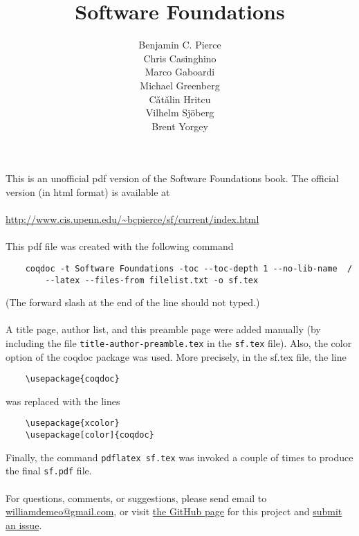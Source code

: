  This is an unofficial pdf version of the Software Foundations book.
The official version (in html format) is available at\\
\\
\url{http://www.cis.upenn.edu/~bcpierce/sf/current/index.html}\\
\\
This pdf file was created with the following command

{\small
\begin{verbatim}
    coqdoc -t Software Foundations -toc --toc-depth 1 --no-lib-name  /
        --latex --files-from filelist.txt -o sf.tex 
\end{verbatim}
}
\noindent (The forward slash at the end of the line should not typed.)\\
\\
A title page, author list, and this preamble page were added manually 
(by including the file {\small {\tt title-author-preamble.tex}} in the {\small
  {\tt sf.tex}} file).  Also, the color option of the coqdoc package was used.  
More precisely, in the sf.tex file, the line
{\small 
\begin{verbatim}
    \usepackage{coqdoc}
\end{verbatim}
}
was replaced with the lines

{\small 
\begin{verbatim}
    \usepackage{xcolor}
    \usepackage[color]{coqdoc}
\end{verbatim}
}
\noindent Finally, the command {\tt pdflatex sf.tex} was invoked a couple of times to
produce the final {\tt sf.pdf} file. \\
\\
For questions, comments, or suggestions, please send email to
\href{mailto:williamdemeo@gmail.com}{williamdemeo@gmail.com}, or visit
\href{https://github.com/TypeFunc/Coq/tree/master/SoftwareFoundations}{the GitHub
  page} for this project and
\href{https://github.com/TypeFunc/Coq/issues}{submit an issue}. 
\newpage


\title{Software Foundations}


\author{
Benjamin C. Pierce 
\\[1ex] Chris Casinghino 
\\[1ex] Marco Gaboardi 
\\[1ex] Michael Greenberg 
\\[1ex] C\v{a}t\v{a}lin Hritcu
\\[1ex] Vilhelm Sj\"{o}berg
\\[1ex] Brent Yorgey}




\maketitle

